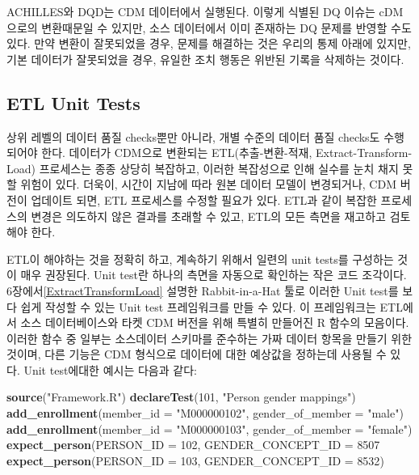 \documentclass[11pt]{book}
\newenvironment{Shaded}{\begin{snugshade}}{\end{snugshade}}
\newcommand{\KeywordTok}[1]{\textcolor[rgb]{0.13,0.29,0.53}{\textbf{#1}}}
\newcommand{\DataTypeTok}[1]{\textcolor[rgb]{0.13,0.29,0.53}{#1}}
\newcommand{\DecValTok}[1]{\textcolor[rgb]{0.00,0.00,0.81}{#1}}
\newcommand{\StringTok}[1]{\textcolor[rgb]{0.31,0.60,0.02}{#1}}
\newcommand{\NormalTok}[1]{#1}
\theoremstyle{definition}
\theoremstyle{definition}
\theoremstyle{definition}
\theoremstyle{remark}
\let\BeginKnitrBlock\begin \let\EndKnitrBlock\end
\begin{document}
\BeginKnitrBlock{rmdimportant}
ACHILLES와 DQD는 CDM 데이터에서 실행된다. 이렇게 식별된 DQ 이슈는
cDM으로의 변환때문일 수 있지만, 소스 데이터에서 이미 존재하는 DQ 문제를
반영할 수도 있다. 만약 변환이 잘못되었을 경우, 문제를 해결하는 것은
우리의 통제 아래에 있지만, 기본 데이터가 잘못되었을 경우, 유일한 조치
행동은 위반된 기록을 삭제하는 것이다.
\EndKnitrBlock{rmdimportant}

\subsection{ETL Unit Tests}\label{etlUnitTests}


상위 레벨의 데이터 품질 checks뿐만 아니라, 개별 수준의 데이터 품질
checks도 수행되어야 한다. 데이터가 CDM으로 변환되는 ETL(추출-변환-적재,
Extract-Transform-Load) 프로세스는 종종 상당히 복잡하고, 이러한
복잡성으로 인해 실수를 눈치 채지 못할 위험이 있다. 더욱이, 시간이 지남에
따라 원본 데이터 모델이 변경되거나, CDM 버전이 업데이트 되면, ETL
프로세스를 수정할 필요가 있다. ETL과 같이 복잡한 프로세스의 변경은
의도하지 않은 결과를 초래할 수 있고, ETL의 모든 측면을 재고하고 검토해야
한다.

ETL이 해야하는 것을 정확히 하고, 계속하기 위해서 일련의 unit tests를
구성하는 것이 매우 권장된다. Unit test란 하나의 측면을 자동으로 확인하는
작은 코드 조각이다. 6장에서\ref{ExtractTransformLoad} 설명한
Rabbit-in-a-Hat 툴로 이러한 Unit test를 보다 쉽게 작성할 수 있는 Unit
test 프레임워크를 만들 수 있다. 이 프레임워크는 ETL에서 소스
데이터베이스와 타켓 CDM 버전을 위해 특별히 만들어진 R 함수의 모음이다.
이러한 함수 중 일부는 소스데이터 스키마를 준수하는 가짜 데이터 항목을
만들기 위한 것이며, 다른 기능은 CDM 형식으로 데이터에 대한 예상값을
정하는데 사용될 수 있다. Unit test에대한 예시는 다음과 같다:

\begin{Shaded}
\begin{Highlighting}[]
\KeywordTok{source}\NormalTok{(}\StringTok{"Framework.R"}\NormalTok{)}
\KeywordTok{declareTest}\NormalTok{(}\DecValTok{101}\NormalTok{, }\StringTok{"Person gender mappings"}\NormalTok{)}
\KeywordTok{add_enrollment}\NormalTok{(}\DataTypeTok{member_id =} \StringTok{"M000000102"}\NormalTok{, }\DataTypeTok{gender_of_member =} \StringTok{"male"}\NormalTok{)}
\KeywordTok{add_enrollment}\NormalTok{(}\DataTypeTok{member_id =} \StringTok{"M000000103"}\NormalTok{, }\DataTypeTok{gender_of_member =} \StringTok{"female"}\NormalTok{)}
\KeywordTok{expect_person}\NormalTok{(}\DataTypeTok{PERSON_ID =} \DecValTok{102}\NormalTok{, }\DataTypeTok{GENDER_CONCEPT_ID =} \DecValTok{8507}
\KeywordTok{expect_person}\NormalTok{(}\DataTypeTok{PERSON_ID =} \DecValTok{103}\NormalTok{, }\DataTypeTok{GENDER_CONCEPT_ID =} \DecValTok{8532}\NormalTok{)}
\end{Highlighting}
\end{Shaded}
\end{document}
